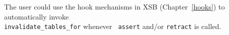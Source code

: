 \begin{description}
\begin{description}
The user could use the hook mechanisms in XSB (Chapter~\ref{hooks}) to
automatically invoke \\ {\tt invalidate\_tables\_for} whenever {\tt
  assert} and/or {\tt retract} is called.



\end{description}




\comment{


%

}




\end{description}
